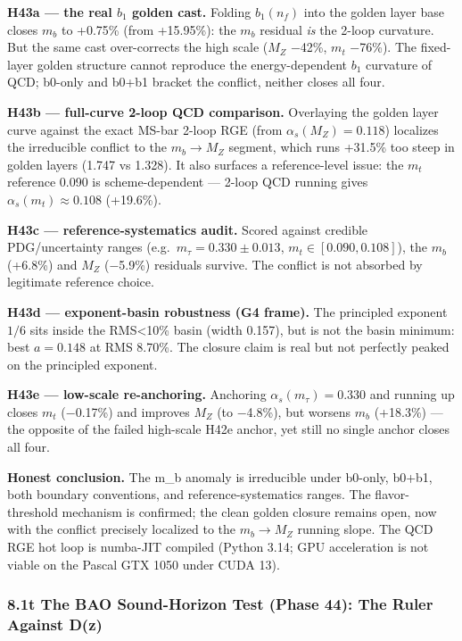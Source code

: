 \documentclass[
]{article}
\begin{document}
\textbf{H43a --- the real \(b_1\) golden cast.} Folding \(b_1(n_f)\)
into the golden layer base closes \(m_b\) to +0.75\% (from +15.95\%):
the \(m_b\) residual \emph{is} the 2-loop curvature. But the same cast
over-corrects the high scale (\(M_Z\) −42\%, \(m_t\) −76\%). The
fixed-layer golden structure cannot reproduce the energy-dependent
\(b_1\) curvature of QCD; b0-only and b0+b1 bracket the conflict,
neither closes all four.

\textbf{H43b --- full-curve 2-loop QCD comparison.} Overlaying the
golden layer curve against the exact MS-bar 2-loop RGE (from
\(\alpha_s(M_Z)=0.118\)) localizes the irreducible conflict to the
\(m_b \to M_Z\) segment, which runs +31.5\% too steep in golden layers
(1.747 vs 1.328). It also surfaces a reference-level issue: the \(m_t\)
reference 0.090 is scheme-dependent --- 2-loop QCD running gives
\(\alpha_s(m_t) \approx 0.108\) (+19.6\%).

\textbf{H43c --- reference-systematics audit.} Scored against credible
PDG/uncertainty ranges (e.g.~\(m_\tau = 0.330 \pm 0.013\),
\(m_t \in [0.090, 0.108]\)), the \(m_b\) (+6.8\%) and \(M_Z\) (−5.9\%)
residuals survive. The conflict is not absorbed by legitimate reference
choice.

\textbf{H43d --- exponent-basin robustness (G4 frame).} The principled
exponent \(1/6\) sits inside the RMS\textless10\% basin (width 0.157),
but is not the basin minimum: best \(a = 0.148\) at RMS 8.70\%. The
closure claim is real but not perfectly peaked on the principled
exponent.

\textbf{H43e --- low-scale re-anchoring.} Anchoring
\(\alpha_s(m_\tau) = 0.330\) and running up closes \(m_t\) (−0.17\%) and
improves \(M_Z\) (to −4.8\%), but worsens \(m_b\) (+18.3\%) --- the
opposite of the failed high-scale H42e anchor, yet still no single
anchor closes all four.

\textbf{Honest conclusion.} The m\_b anomaly is irreducible under
b0-only, b0+b1, both boundary conventions, and reference-systematics
ranges. The flavor-threshold mechanism is confirmed; the clean golden
closure remains open, now with the conflict precisely localized to the
\(m_b \to M_Z\) running slope. The QCD RGE hot loop is numba-JIT
compiled (Python 3.14; GPU acceleration is not viable on the Pascal GTX
1050 under CUDA 13).

\subsubsection{8.1t The BAO Sound-Horizon Test (Phase 44): The Ruler
Against
D(z)}\label{t-the-bao-sound-horizon-test-phase-44-the-ruler-against-dz}
\end{document}
